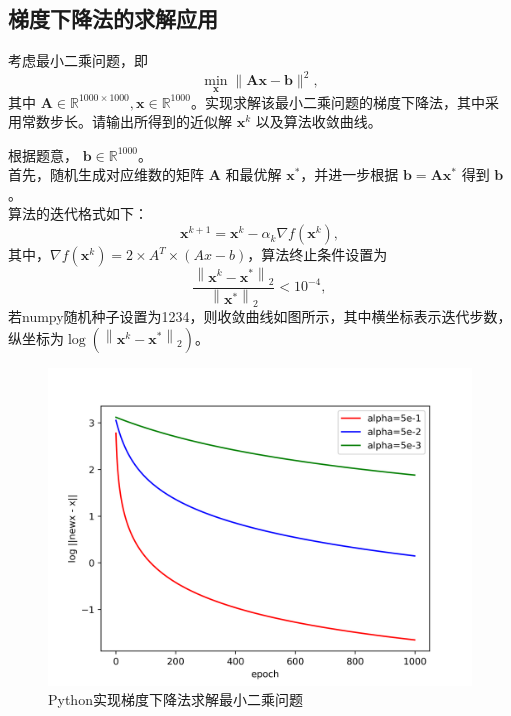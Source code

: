 \subsection{梯度下降法的求解应用}
\begin{example}[实践题]
    考虑最小二乘问题，即
    \begin{equation}
        \min _{\bm{x}}\|\bm{A} \bm{x}-\bm{b}\|^{2} ,
        \nonumber
    \end{equation}
其中 $\bm{A} \in \mathbb{R}^{1000 \times 1000}, \bm{x} \in \mathbb{R}^{1000}$。实现求解该最小二乘问题的梯度下降法，其中采用常数步长。请输出所得到的近似解 $\bm{x}^{k}$ 以及算法收敛曲线。
\end{example}
\begin{solution}
    根据题意， $\bm{b} \in \mathbb{R}^{1000}$。\\
    首先，随机生成对应维数的矩阵 $\bm{A}$ 和最优解 $\bm{x}^{*}$，并进一步根据 $\bm{b}=\bm{A} \bm{x}^{*}$ 得到 $\bm{b}$ 。\\
    算法的迭代格式如下：
    \begin{equation}
        \bm{x}^{k+1}=\bm{x}^{k}-\alpha_{k} \nabla f\left(\bm{x}^{k}\right),
        \nonumber
    \end{equation}
    其中，$\nabla f\left(\bm{x}^{k}\right)=2 \times A^T \times (Ax-b)$，算法终止条件设置为
    \begin{equation}
        \frac{\left\|\bm{x}^{k}-\bm{x}^{*}\right\|_{2}}{\left\|\bm{x}^{*}\right\|_{2}}<10^{-4},
        \nonumber
    \end{equation}
    若numpy随机种子设置为1234，则收敛曲线如图所示，其中横坐标表示迭代步数，纵坐标为$\log \left(\left\|\bm{x}^{k}-\bm{x}^{*}\right\|_{2}\right)$。
    \begin{figure}[hbtp]
        \centering
        \includegraphics[width=150mm]{./Figures/gd-log.png}
        \caption{Python实现梯度下降法求解最小二乘问题}
        \label{figure_gd}
    \end{figure}
\end{solution}

